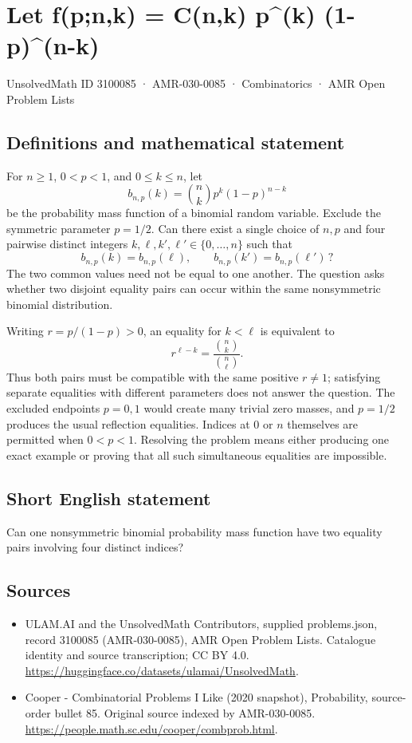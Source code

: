 \documentclass[11pt,a4paper]{article}
\begin{document}
\section*{Let f(p;n,k) = C(n,k) p\textasciicircum{}(k) (1-p)\textasciicircum{}(n-k)}\label{3100085}
{\small UnsolvedMath ID 3100085 · AMR-030-0085 · Combinatorics · AMR Open Problem Lists}
\subsection{Definitions and mathematical statement}
For $n\ge1$, $0<p<1$, and $0\le k\le n$, let
\[
              b_{n,p}(k)=\binom nk p^k(1-p)^{n-k}
\]
be the probability mass function of a binomial random variable.
Exclude the symmetric parameter $p=1/2$. Can there exist a single
choice of $n,p$ and four pairwise distinct integers
$k,\ell,k',\ell'\in\{0,\ldots,n\}$ such that
\[
           b_{n,p}(k)=b_{n,p}(\ell),
                  \qquad
           b_{n,p}(k')=b_{n,p}(\ell')\,?
\]
The two common values need not be equal to one another. The
question asks whether two disjoint equality pairs can occur
within the same nonsymmetric binomial distribution.

Writing $r=p/(1-p)>0$, an equality for $k<\ell$ is equivalent to
\[
                r^{\ell-k}=\frac{\binom nk}{\binom n\ell}.
\]
Thus both pairs must be compatible with the same positive
$r\ne1$; satisfying separate equalities with different parameters
does not answer the question. The excluded endpoints $p=0,1$
would create many trivial zero masses, and $p=1/2$ produces
the usual reflection equalities. Indices at $0$ or $n$ themselves
are permitted when $0<p<1$. Resolving the problem means either
producing one exact example or proving that all such simultaneous
equalities are impossible.
\subsection{Short English statement}
Can one nonsymmetric binomial probability mass function have two equality pairs involving four distinct indices?
\subsection{Sources}
\begin{itemize}
\item[S1] ULAM.AI and the UnsolvedMath Contributors, supplied problems.json, record 3100085 (AMR-030-0085), AMR Open Problem Lists. Catalogue identity and source transcription; CC BY 4.0.
\url{https://huggingface.co/datasets/ulamai/UnsolvedMath}.
\item[S2] Cooper - Combinatorial Problems I Like (2020 snapshot), Probability, source-order bullet 85. Original source indexed by AMR-030-0085.
\url{https://people.math.sc.edu/cooper/combprob.html}.
\end{itemize}
\end{document}
